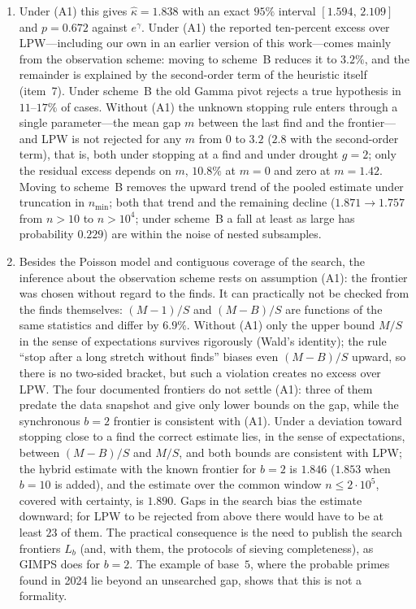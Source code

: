 \documentclass[11pt,a4paper]{article}
\theoremstyle{plain}
\theoremstyle{remark}
\newcommand{\eg}{e^{\gamma}}
\begin{document}
\begin{enumerate}
\item Under (A1) this gives $\hat\kappa=1.838$ with an exact $95\%$ interval
$[1.594,\,2.109]$ and $p=0.672$ against $\eg$. Under (A1) the reported
ten-percent excess over LPW---including our own in an earlier version of this
work---comes mainly from the observation scheme: moving to scheme~B reduces it to
$3.2\%$, and the remainder is explained by the second-order term of the heuristic
itself (item~7). Under scheme~B the old Gamma pivot rejects a true hypothesis in
$11$--$17\%$ of cases. Without (A1) the unknown stopping rule enters through a single parameter---the
mean gap $m$ between the last find and the frontier---and LPW is not rejected for
any $m$ from $0$ to $3.2$ ($2.8$ with the second-order term), that is, both under
stopping at a find and under drought $g=2$; only the residual excess depends on $m$, $10.8\%$ at $m=0$ and
zero at $m=1.42$. Moving to scheme~B removes the upward trend of the pooled
estimate under truncation in $n_{\min}$; both that trend and the remaining
decline ($1.871\to1.757$ from $n>10$ to $n>10^4$; under scheme~B a fall at least as
large has probability $0.229$) are within the noise of nested subsamples.

\item Besides the Poisson model and contiguous coverage of the search, the
inference about the observation scheme rests on assumption (A1): the frontier
was chosen without regard to the finds. It can practically not be checked from
the finds themselves: $(M-1)/S$ and $(M-B)/S$ are functions of the same statistics and
differ by $6.9\%$. Without (A1) only the upper bound $M/S$ in the sense of
expectations survives rigorously (Wald's identity); the rule ``stop after a long
stretch without finds'' biases even $(M-B)/S$ upward, so there is no two-sided
bracket, but such a violation creates no excess over LPW. The four
documented frontiers do not settle (A1): three of them predate the data snapshot
and give only lower bounds on the gap, while the synchronous $b=2$ frontier is
consistent with (A1). Under a deviation toward stopping close to a find the
correct estimate lies, in the sense of expectations, between $(M-B)/S$ and $M/S$,
and both bounds are consistent with LPW; the hybrid estimate with the known
frontier for $b=2$ is $1.846$ ($1.853$ when $b=10$ is added), and the estimate over the common window
$n\le2\cdot10^5$, covered with certainty, is $1.890$. Gaps in the search bias the
estimate downward; for LPW to be rejected from above there would have to be at
least $23$ of them. The practical consequence is the need to publish the search
frontiers $L_b$ (and, with them, the protocols of sieving completeness), as
GIMPS does for $b=2$. The example of base~$5$, where the probable primes found
in 2024 lie beyond an unsearched gap, shows that this is not a formality.


\end{enumerate}
\end{document}
